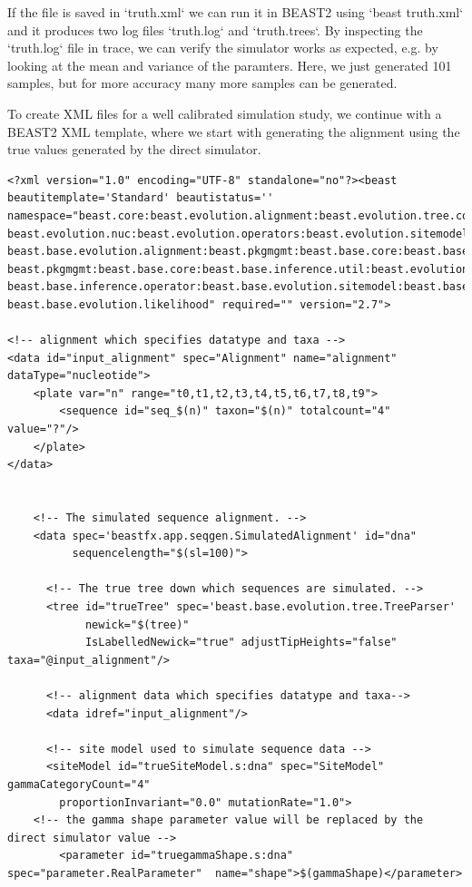 \documentclass[oneside]{article}
\begin{document}
If the file is saved in `truth.xml` we can run it in BEAST2 using `beast truth.xml` and it produces two log files `truth.log` and `truth.trees`.
By inspecting the `truth.log` file in trace, we can verify the simulator works as expected, e.g. by looking at the mean and variance of the paramters.
Here, we just generated 101 samples, but for more accuracy many more samples can be generated.

To create XML files for a well calibrated simulation study, we continue with a BEAST2 XML template, where we start with generating the alignment using the true values generated by the direct simulator.

{\scriptsize
\begin{lstlisting}
<?xml version="1.0" encoding="UTF-8" standalone="no"?><beast beautitemplate='Standard' beautistatus='' 
namespace="beast.core:beast.evolution.alignment:beast.evolution.tree.coalescent:beast.core.util:
beast.evolution.nuc:beast.evolution.operators:beast.evolution.sitemodel:beast.evolution.substitutionmodel:
beast.base.evolution.alignment:beast.pkgmgmt:beast.base.core:beast.base.inference:beast.base.evolution.tree.coalescent:
beast.pkgmgmt:beast.base.core:beast.base.inference.util:beast.evolution.nuc:beast.base.evolution.operator:
beast.base.inference.operator:beast.base.evolution.sitemodel:beast.base.evolution.substitutionmodel:
beast.base.evolution.likelihood" required="" version="2.7">

<!-- alignment which specifies datatype and taxa -->
<data id="input_alignment" spec="Alignment" name="alignment"  dataType="nucleotide">
    <plate var="n" range="t0,t1,t2,t3,t4,t5,t6,t7,t8,t9">
        <sequence id="seq_$(n)" taxon="$(n)" totalcount="4" value="?"/>
    </plate>
</data>


    <!-- The simulated sequence alignment. -->
    <data spec='beastfx.app.seqgen.SimulatedAlignment' id="dna"
          sequencelength="$(sl=100)">

      <!-- The true tree down which sequences are simulated. -->
      <tree id="trueTree" spec='beast.base.evolution.tree.TreeParser'
            newick="$(tree)"
            IsLabelledNewick="true" adjustTipHeights="false" taxa="@input_alignment"/>

      <!-- alignment data which specifies datatype and taxa-->
      <data idref="input_alignment"/>

      <!-- site model used to simulate sequence data -->
      <siteModel id="trueSiteModel.s:dna" spec="SiteModel" gammaCategoryCount="4" 
      	proportionInvariant="0.0" mutationRate="1.0">
	<!-- the gamma shape parameter value will be replaced by the direct simulator value -->
        <parameter id="truegammaShape.s:dna" spec="parameter.RealParameter"  name="shape">$(gammaShape)</parameter>
        

\end{lstlisting}}
\end{document}
